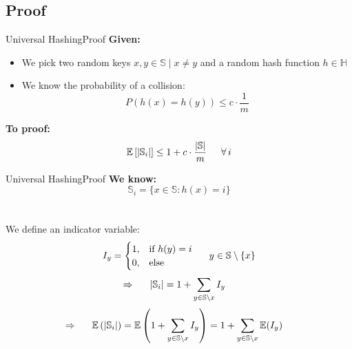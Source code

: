 \subsection{Proof}
\def\E{\mathbb{E}}
\begin{frame}{Universal Hashing}{Proof}
  \textbf{Given:}
  \begin{itemize}
    \item<1->
      We pick two random keys
      {\color{MainA}$x, y \in \mathbb{S} \mid x \neq y$} and
      a random hash function {\color{MainA}$h \in \mathbb{H}$}
    \item<2->
      We know the probability of a collision:
      {\color{MainA}\[P(h(x) = h(y)) \leq c \cdot \frac{1}{m}\]}
  \end{itemize}
  \textbf{To proof:}
  {\color{MainA}\[\E\left[\vert \mathbb{S}_i \vert\right]
    \leq 1 + c \cdot \frac{\vert \mathbb{S} \vert}{m}
    \hspace*{1.5em} \forall \, i\]}
\end{frame}


\begin{frame}{Universal Hashing}{Proof}
  \textbf{We know:}
  {\color{MainA}\[\mathbb{S}_i = \{x \in \mathbb{S}: h(x) = i\}\]}\\
  \\[0.5em]
  We define an indicator variable:
  {\color{MainA}
  \begin{displaymath}
    I_y = \begin{cases}
      1, & \text{if } h(y) = i\\
      0, & \text{else}
    \end{cases} \hspace*{1.5em} y \in \mathbb{S} \setminus \{x\}
  \end{displaymath}
  \begin{align*}
    \Rightarrow \hspace{1.5em} \vert \mathbb{S}_i \vert
    & = 1 + \sum_{y \in \mathbb{S} \setminus x} I_y
  \end{align*}
  \begin{align*}
    \Rightarrow \hspace{1.5em} \E\left(\vert \mathbb{S}_i \vert\right)
      & = \E\left(1 + \sum_{y \in \mathbb{S} \setminus x} I_y\right)
        = 1 + \sum_{y \in \mathbb{S} \setminus x} \E(I_y)
  \end{align*}}
\end{frame}

